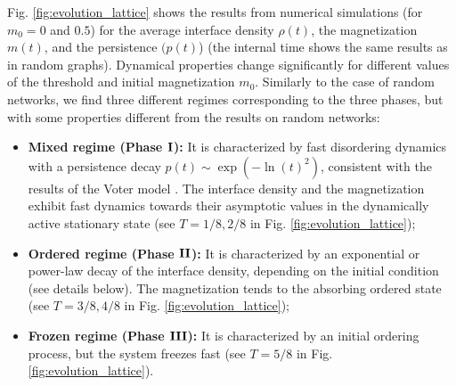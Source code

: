 Fig. \ref{fig:evolution_lattice} shows the results from numerical simulations (for $m_0 = 0$ and $0.5$) for the average interface density $\rho(t)$, the magnetization $m(t)$, and the persistence $(p(t)$) (the internal time shows the same results as in random graphs). Dynamical properties change significantly for different values of the threshold and initial magnetization $m_0$. Similarly to the case of random networks, we find three different regimes corresponding to the three phases, but with some properties different from the results on  random networks:
\begin{itemize}
	\item \textbf{Mixed regime (Phase ${\rm {\bf I}}$):} It is characterized by fast disordering dynamics with a persistence decay $p(t) \sim \exp(- \ln(t)^2)$, consistent with the results of the Voter model \cite{ben-naim-1996}. The interface density and the magnetization exhibit fast dynamics towards their asymptotic values in the dynamically active stationary state (see $T = 1/8,2/8$ in Fig. \ref{fig:evolution_lattice});
	\item \textbf{Ordered regime (Phase ${\rm {\bf II}}$):} It is characterized by an exponential or power-law decay of the interface density, depending on the initial condition (see details below). The magnetization tends to the absorbing ordered state (see $T = 3/8,4/8$ in Fig. \ref{fig:evolution_lattice});
	\item \textbf{Frozen regime (Phase ${\rm {\bf III}}$):} It is characterized by an initial ordering process, but the system freezes fast (see $T = 5/8$ in Fig. \ref{fig:evolution_lattice}).
\end{itemize}

